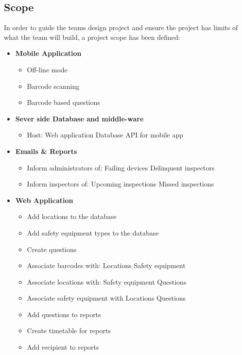 \documentclass[Letter,11pt]{article}
\begin{document}
	\subsection{Scope}\label{scope}
	In order to guide the teams design project and ensure the project has limits of what the team will build, a project scope has been defined:
	\\
	\begin{minipage}[t]{0.5\textwidth}
		\begin{itemize}
			\item \textbf{Mobile Application}
			\begin{itemize}
				\item Off-line mode
				\item Barcode scanning
				\item Barcode based questions
			\end{itemize}
			\item \textbf{Sever side Database and middle-ware}
			\begin{itemize}
				\item Host:
					\subitem Web application
					\subitem Database API for mobile app
			\end{itemize}
			\item\textbf{ Emails \& Reports}
			\begin{itemize}
				\item Inform administrators of:
					\subitem Failing devices
					\subitem Delinquent inspectors
				\item Inform inspectors of:
					\subitem Upcoming inspections
					\subitem Missed inspections
			\end{itemize}
		\end{itemize}
	\end{minipage}
	\begin{minipage}[t]{0.5\textwidth}
		\begin{itemize}
			\item \textbf{Web Application}
				\begin{itemize}
					\item Add locations to the database
					\item Add safety equipment types to the database
					\item Create questions
					\item Associate barcodes with:
						\subitem Locations
						\subitem Safety equipment
					\item Associate locations with:
						\subitem Safety equipment
						\subitem Questions
					\item Associate safety equipment with
						\subitem Locations
						\subitem Questions
					\item Add questions to reports
					\item Create timetable for reports
					\item Add recipient to reports
				\end{itemize}
		\end{itemize}
	\end{minipage}
		
\end{document}
